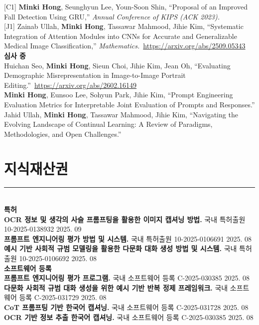\documentclass[10pt,a4paper]{article}
\newcommand{\sectionrule}{\vspace{-0.5em}\rule{\textwidth}{0.4pt}\\[0.2em]}
\newcommand{\cvdate}[1]{\hfill #1}
\begin{document}
[C1] \textbf{Minki Hong}, Seunghyun Lee, Youn-Soon Shin, ``Proposal of an Improved Fall Detection Using GRU,'' \textit{Annual Conference of KIPS (ACK 2023).}\\[2pt]
[J1] Zainab Ullah, \textbf{Minki Hong}, Tassawar Mahmood, Jihie Kim, ``Systematic Integration of Attention Modules into CNNs for Accurate and Generalizable Medical Image Classification,'' \textit{Mathematics.}~\url{https://arxiv.org/abs/2509.05343}\\[4pt]
\vspace{2pt}
{\large\textbf{심사 중}}\\[2pt]
Huichan Seo, \textbf{Minki Hong}, Sieun Choi, Jihie Kim, Jean Oh, ``Evaluating Demographic Misrepresentation in Image-to-Image Portrait Editing.''~\url{https://arxiv.org/abs/2602.16149}\\[2pt]
\textbf{Minki Hong}, Eunsoo Lee, Sohyun Park, Jihie Kim, ``Prompt Engineering Evaluation Metrics for Interpretable Joint Evaluation of Prompts and Responses.''\\[2pt]
Jahid Ullah, \textbf{Minki Hong}, Tassawar Mahmood, Jihie Kim, ``Navigating the Evolving Landscape of Continual Learning: A Review of Paradigms, Methodologies, and Open Challenges.''

\section{지식재산권}
\sectionrule
{\large\textbf{특허}}\\[2pt]
\textbf{OCR 정보 및 생각의 사슬 프롬프팅을 활용한 이미지 캡셔닝 방법.} 국내 특허출원 10-2025-0138932 \cvdate{2025. 09}\\[2pt]
\textbf{프롬프트 엔지니어링 평가 방법 및 시스템.} 국내 특허출원 10-2025-0106691 \cvdate{2025. 08}\\[2pt]
\textbf{예시 기반 사회적 규범 모델링을 활용한 다문화 대화 생성 방법 및 시스템.} 국내 특허출원 10-2025-0106692 \cvdate{2025. 08}\\[4pt]
\vspace{2pt}
{\large\textbf{소프트웨어 등록}}\\[2pt]
\textbf{프롬프트 엔지니어링 평가 프로그램.} 국내 소프트웨어 등록 C-2025-030385 \cvdate{2025. 08}\\[2pt]
\textbf{다문화 사회적 규범 대화 생성을 위한 예시 기반 반복 정제 프레임워크.} 국내 소프트웨어 등록 C-2025-031729 \cvdate{2025. 08}\\[2pt]
\textbf{CoT 프롬프팅 기반 한국어 캡셔닝.} 국내 소프트웨어 등록 C-2025-031728 \cvdate{2025. 08}\\[2pt]
\textbf{OCR 기반 정보 추출 한국어 캡셔닝.} 국내 소프트웨어 등록 C-2025-030385 \cvdate{2025. 08}
\end{document}
